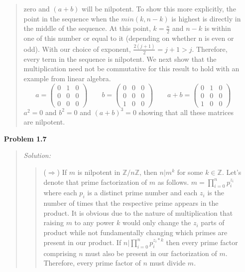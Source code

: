\documentclass{article}
\newcommand{\Solution}{\textit{Solution: }}
\begin{document}
\begin{enumerate}
\begin{quote}
                zero and $(a + b)$ will be nilpotent. To show this more explicitly, the point in the sequence when the $min(k, n - k)$ is highest is 
                directly in the middle of the sequence. At this point, $k = \frac{n}{2}$ and $n - k$ is within one of this number or equal to it 
                (depending on whether n is even or odd). With our choice of exponent, $\frac{2(j+1)}{2} = j + 1 > j$. Therefore, every term in the
                sequence is nilpotent. We next show that the multiplication need not be commutative for this result to hold with an example from linear algebra.
                \begin{equation*}
                    a = \begin{pmatrix}
                        0 & 1 & 0 \\
                        0 & 0 & 0 \\
                        0 & 0 & 0
                    \end{pmatrix} \qquad
                    b = \begin{pmatrix}
                        0 & 0 & 0 \\
                        0 & 0 & 0 \\
                        1 & 0 & 0
                    \end{pmatrix} \qquad
                    a + b = \begin{pmatrix}
                        0 & 1 & 0 \\
                        0 & 0 & 0 \\
                        1 & 0 & 0
                    \end{pmatrix}
                \end{equation*}
                $a^2 = 0$ and $b^2 = 0$ and $(a+b)^3 = 0$ showing that all these matrices are nilpotent. \qedsymbol
            \end{quote}
        \item[\textbf{Problem 1.7}]
        \begin{quote}
            \Solution 
            \begin{quote}
                ($\Rightarrow$) If $m$ is nilpotent in $\mathbb{Z}/n\mathbb{Z}$, then $n \vert m^k$ for some $k \in \mathbb{Z}$.
                Let's denote that prime factorization of $m$ as follows. $m = \prod_{i = 0}^n p_i^{z_i}$ where each $p_i$ is a distinct
                prime number and each $z_i$ is the number of times that the respective prime appears in the product. It is obvious due to the
                nature of multiplication that raising $m$ to any power $k$ would only change the $z_i$ parts of product while not fundamentally
                changing which primes are present in our product. If $n \vert \prod_{i = 0}^n p_i^{z_i*k}$ then every prime factor comprising $n$
                must also be present in our factorization of $m$. Therefore, every prime factor of $n$ must divide $m$.
            \end{quote}


\end{quote}
\end{enumerate}
\end{document}
